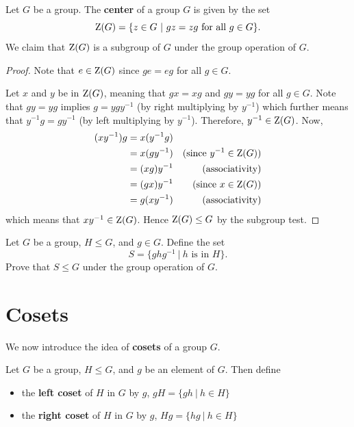\begin{example}\label{example-center-of-group}
    Let $G$ be a group. The \textbf{center} of a group $G$ is given by the set
    \[
        \Z{G} = \{z \in G \ | \ gz = zg \text{ for all } g \in G\}.
    \]
    We claim that $\mathrm{Z}(G)$ is a subgroup of $G$ under the group operation of $G$.

    \begin{proof}
	    Note that $e \in \mathrm{Z}(G)$ since $ge = eg$ for all $g \in G$.

	    Let $x$ and $y$ be in $\mathrm{Z}(G)$, meaning that $gx = xg$ and $gy = yg$ for all $g \in G$. Note that $gy = yg$ implies $g = ygy^{-1}$ (by right multiplying by $y^{-1}$) which further means that $y^{-1}g = gy^{-1}$ (by left multiplying by $y^{-1}$). Therefore, $y^{-1} \in \mathrm{Z}(G)$. Now,
	    \begin{align*}
	        (xy^{-1})g &= x(y^{-1}g)\\
	        &= x(gy^{-1}) & (\text{since } y^{-1} \in \mathrm{Z}(G))\\
	        &= (xg)y^{-1} & (\text{associativity})\\
	        &= (gx)y^{-1} & (\text{since } x \in \mathrm{Z}(G))\\
	        &= g(xy^{-1}) & (\text{associativity})
	    \end{align*}
	    which means that $xy^{-1} \in \mathrm{Z}(G)$. Hence $\mathrm{Z}(G) \leq G$ by the subgroup test.
    \end{proof}
\end{example}

\begin{exercise}\label{exercise-conjugate-subgroup}
    Let $G$ be a group, $H \leq G$, and $g \in G$. Define the set
    \[
        S = \{ghg^{-1} \ | \ h \text{ is in } H\}.
    \]
    Prove that $S \leq G$ under the group operation of $G$.
\end{exercise}

\newpage

\section{Cosets}
We now introduce the idea of \textbf{cosets} of a group $G$.
\begin{definition}
    Let $G$ be a group, $H \leq G$, and $g$ be an element of $G$. Then define
    \begin{itemize}
        \item the \textbf{left coset} of $H$ in $G$ by $g$, $gH = \{gh \ | \ h \in H\}$
        \item the \textbf{right coset} of $H$ in $G$ by $g$, $Hg = \{hg \ | \ h \in H\}$
    \end{itemize}
\end{definition}

